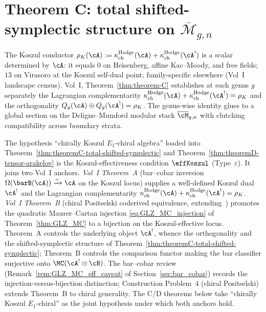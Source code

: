 \section{Theorem C: total shifted-symplectic structure on $\overline{\mathcal{M}}_{g,n}$}
\label{sec:theoremC-total-shifted-symplectic-native}

The Koszul conductor
$\rho_K(\cA) := \kappaChHodge(\cA) + \kappaChHodge(\cA^!)$ is a
scalar determined by $\cA$: it equals $0$ on Heisenberg, affine
Kac--Moody, and free fields; $13$ on Virasoro at the Koszul
self-dual point; family-specific elsewhere (Vol~I landscape
census). Vol~I, Theorem~\ref*{thm:theorem-C} establishes at each
genus $g$ separately the Lagrangian complementarity
$\kappaChHodge(\cA) + \kappaChHodge(\cA^!) = \rho_K$ and the
orthogonality $Q_g(\cA) \oplus Q_g(\cA^!) = \rho_K$. The
genus-wise identity glues to a global section on the
Deligne--Mumford modular stack $\overline{\cM}_{g,n}$ with
clutching compatibility across boundary strata.

\begin{remark}
\label{rem:theoremC-A-vs-B-signpost}
The hypothesis ``chirally Koszul $E_1$-chiral algebra'' loaded
into Theorem~\ref{thm:theoremC-total-shifted-symplectic} and
Theorem~\ref{thm:theoremD-tensor-arakelov} is the
Koszul-effectiveness condition $\effKoszul$ (Type~$\varepsilon$).
It joins two Vol~I anchors. \emph{Vol~I Theorem~A} (bar--cobar
inversion $\Omega(\barB(\cA)) \xrightarrow{\sim} \cA$ on the
Koszul locus) supplies a well-defined Koszul dual~$\cA^!$ and the
Lagrangian complementarity
$\kappaChHodge(\cA) + \kappaChHodge(\cA^!) = \rho_K$.
\emph{Vol~I Theorem~B} (chiral Positselski coderived equivalence,
extending~\cite{Positselski11}) promotes the quadratic
Maurer--Cartan injection \eqref{eq:GLZ_MC_injection} of
Theorem~\ref{thm:GLZ_MC} to a bijection on the Koszul-effective
locus. Theorem~A controls the underlying object $\cA^!$, whence
the orthogonality and the shifted-symplectic structure of
Theorem~\ref{thm:theoremC-total-shifted-symplectic}; Theorem~B
controls the comparison functor making the bar classifier
surjective onto $\MC(\cA^! \otimes \cB)$. The bar--cobar review
(Remark~\ref{rem:GLZ_MC_eff_caveat} of
Section~\ref{sec:bar_cobar}) records the
injection-versus-bijection distinction; Construction Problem~4
(chiral Positselski) extends Theorem~B to chiral generality. The
C/D theorems below take ``chirally Koszul $E_1$-chiral'' as the
joint hypothesis under which both anchors hold.
\end{remark}

